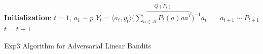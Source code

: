 \documentclass[letterpaper,11pt,openright,openany]{book}
\numberwithin{equation}{section}
\theoremstyle{plain}
\theoremstyle{definition}
\begin{document}
\begin{algorithm}[H]
 \begin{algorithmic}[1]
 \STATE \textbf{Initialization}: $t=1$, $a_1\sim p$
\STATE $\hat{Y}_t = \langle a_t, y_t\rangle\big(\overbrace{\sum_{a\in\mathcal A}P_{t}(a)aa^T}^{Q(P_t)}\big)^{-1} a_t$\ \ \ 
\STATE $a_{t+1}\sim P_{t+1}$
\STATE $t = t +1$ 
\ENDWHILE
\end{algorithmic}
\caption{Exp3 Algorithm for Adversarial Linear Bandits} 
\label{alg:al-Exp3}
\end{algorithm}
\end{document}
